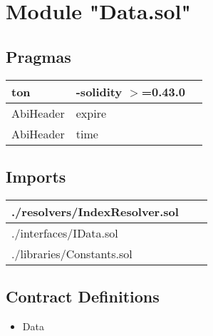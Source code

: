 
\section{Module "Data.sol"}


\subsection{Pragmas}


\noindent\begin{tabular}{|l|l|p{5cm}|}\hline
ton & -solidity $>$=0.43.0 &\\\hline
AbiHeader &  expire &\\\hline
AbiHeader &  time &\\\hline
\end{tabular}


\subsection{Imports}


\noindent\begin{tabular}{|l|l|p{5cm}|}\hline
./resolvers/IndexResolver.sol &\\\hline
./interfaces/IData.sol &\\\hline
./libraries/Constants.sol &\\\hline
\end{tabular}


\subsection{Contract Definitions}

\begin{itemize}
\item Data
\end{itemize}
